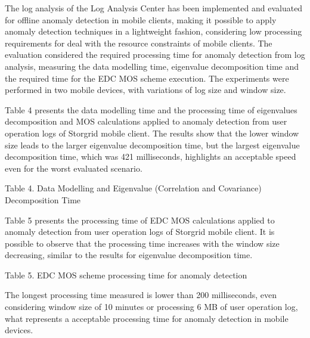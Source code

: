 \documentclass[twocolumn]{svjour3}          	%
\begin{document}
The log analysis of the Log Analysis Center has been implemented and evaluated for offline anomaly detection in mobile clients, making it possible to apply anomaly detection techniques in a lightweight fashion, considering low processing requirements for deal with the resource constraints of mobile clients. The evaluation considered the required processing time for anomaly detection from log analysis, measuring the data modelling time, eigenvalue decomposition time and the required time for the EDC MOS scheme execution. The experiments were performed in two mobile devices, with variations of log size and window size. 

Table 4 presents the data modelling time and the processing time of eigenvalues decomposition and MOS calculations applied to anomaly detection from user operation logs of Storgrid mobile client. The results show that the lower window size leads to the larger eigenvalue decomposition time, but the largest eigenvalue decomposition time, which was 421 milliseconds, highlights an acceptable speed even for the worst evaluated scenario.

Table 4. Data Modelling and Eigenvalue (Correlation and Covariance) Decomposition Time 

Table 5 presents the processing time of EDC MOS calculations applied to anomaly detection from user operation logs of Storgrid mobile client. It is possible to observe that the processing time increases with the window size decreasing, similar to the results for eigenvalue decomposition time. 

Table 5. EDC MOS scheme processing time for anomaly detection 

The longest processing time measured is lower than 200 milliseconds, even considering window size of 10 minutes or processing 6 MB of user operation log, what represents a acceptable processing time for anomaly detection in mobile devices.
\end{document}
